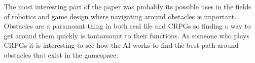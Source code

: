\documentclass{article}
\begin{document}
   The most interesting part of the paper was probably its possible uses in the fields of robotics and game design where navigating around obstacles is important. 
   Obstacles are a paramount thing in both real life and CRPGs so finding a way to get around them quickly is tantamount to their functions.
   As someone who plays CRPGs it is interesting to see how the AI works to find the best path around obstacles that exist in the gamespace.
   \medskip

   
   
\end{document}
